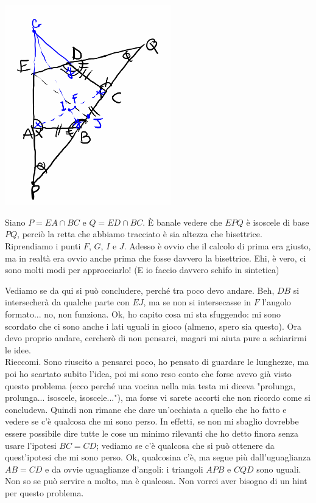 \begin{sol}
  \begin{center}
    \includegraphics[width=0.54\textwidth]{secs/G1/G1-3.pdf}
  \end{center}

  Siano $P=EA \cap BC$ e $Q=ED \cap BC$. È banale vedere che $EPQ$ è isoscele di base $PQ$, perciò la retta che abbiamo tracciato è sia altezza che bisettrice. Riprendiamo i punti $F$, $G$, $I$ e $J$. Adesso è ovvio che il calcolo di prima era giusto, ma in realtà era ovvio anche prima che fosse davvero la bisettrice. Ehi, è vero, ci sono molti modi per approcciarlo! (E io faccio davvero schifo in sintetica)

  Vediamo se da qui si può concludere, perché tra poco devo andare. Beh, $DB$ si intersecherà da qualche parte con $EJ$, ma se non si intersecasse in $F$ l'angolo formato... no, non funziona. Ok, ho capito cosa mi sta sfuggendo: mi sono scordato che ci sono anche i lati uguali in gioco (almeno, spero sia questo). Ora devo proprio andare, cercherò di non pensarci, magari mi aiuta pure a schiarirmi le idee. \\

  Rieccomi. Sono riuscito a pensarci poco, ho pensato di guardare le lunghezze, ma poi ho scartato subito l'idea, poi mi sono reso conto che forse avevo già visto questo problema (ecco perché una vocina nella mia testa mi diceva "prolunga, prolunga... isoscele, isoscele..."), ma forse vi sarete accorti che non ricordo come si concludeva. Quindi non rimane che dare un'occhiata a quello che ho fatto e vedere se c'è qualcosa che mi sono perso. In effetti, se non mi sbaglio dovrebbe essere possibile dire tutte le cose un minimo rilevanti che ho detto finora senza usare l'ipotesi $BC=CD$; vediamo se c'è qualcosa che si può ottenere da quest'ipotesi che mi sono perso. Ok, qualcosina c'è, ma segue più dall'uguaglianza $AB=CD$ e da ovvie uguaglianze d'angoli: i triangoli $APB$ e $CQD$ sono uguali. Non so se può servire a molto, ma è qualcosa. Non vorrei aver bisogno di un hint per questo problema.


\end{sol}
